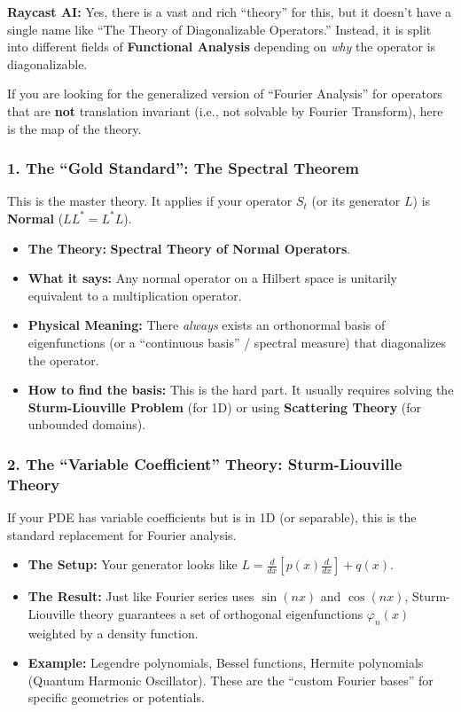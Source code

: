\documentclass[oneside]{book}
\renewcommand{\phi}{\varphi}
\begin{document}
\noindent \textbf{Raycast AI:} Yes, there is a vast and rich ``theory'' for this, but it doesn't have a single name like ``The Theory of Diagonalizable Operators.'' Instead, it is split into different fields of \textbf{Functional Analysis} depending on \textit{why} the operator is diagonalizable.

If you are looking for the generalized version of ``Fourier Analysis'' for operators that are \textbf{not} translation invariant (i.e., not solvable by Fourier Transform), here is the map of the theory.

\subsubsection*{1. The ``Gold Standard'': The Spectral Theorem}
This is the master theory. It applies if your operator $S_t$ (or its generator $L$) is \textbf{Normal} ($LL^* = L^*L$).

\begin{itemize}
    \item \textbf{The Theory:} \textbf{Spectral Theory of Normal Operators}.
    \item \textbf{What it says:} Any normal operator on a Hilbert space is unitarily equivalent to a multiplication operator.
    \item \textbf{Physical Meaning:} There \textit{always} exists an orthonormal basis of eigenfunctions (or a ``continuous basis'' / spectral measure) that diagonalizes the operator.
    \item \textbf{How to find the basis:} This is the hard part. It usually requires solving the \textbf{Sturm-Liouville Problem} (for 1D) or using \textbf{Scattering Theory} (for unbounded domains).
\end{itemize}

\subsubsection*{2. The ``Variable Coefficient'' Theory: Sturm-Liouville Theory}
If your PDE has variable coefficients but is in 1D (or separable), this is the standard replacement for Fourier analysis.

\begin{itemize}
    \item \textbf{The Setup:} Your generator looks like $L = \frac{d}{dx}[p(x)\frac{d}{dx}] + q(x)$.
    \item \textbf{The Result:} Just like Fourier series uses $\sin(nx)$ and $\cos(nx)$, Sturm-Liouville theory guarantees a set of orthogonal eigenfunctions $\phi_n(x)$ weighted by a density function.
    \item \textbf{Example:} Legendre polynomials, Bessel functions, Hermite polynomials (Quantum Harmonic Oscillator). These are the ``custom Fourier bases'' for specific geometries or potentials.
\end{itemize}
\end{document}
